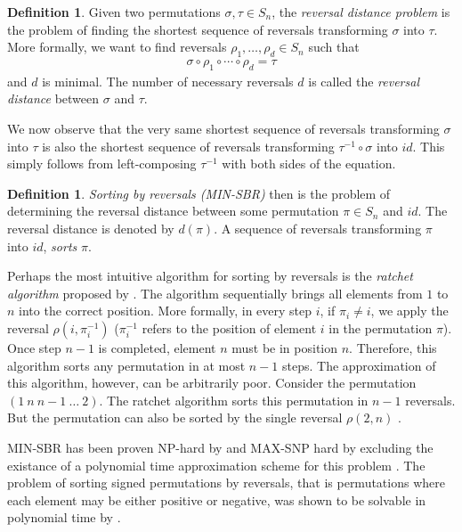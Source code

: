 \documentclass[11pt,DIV=11]{scrartcl}
\theoremstyle{definition}
\newtheorem{definition}[theorem]{Definition}
\theoremstyle{remark}
\begin{document}
\begin{definition}
Given two permutations $\sigma, \tau \in S_n$, the \textit{reversal distance problem} is the problem of finding the shortest sequence of reversals transforming $\sigma$ into $\tau$. More formally, we want to find reversals $\rho_1, \dots, \rho_d \in S_n$ such that
\begin{align*}
    \sigma \circ \rho_1 \circ \cdots \circ \rho_d = \tau
\end{align*}
and $d$ is minimal.
The number of necessary reversals $d$ is called the \textit{reversal distance} between $\sigma$ and $\tau$.
\end{definition}

We now observe that the very same shortest sequence of reversals transforming $\sigma$ into $\tau$ is also the shortest sequence of reversals transforming $\tau^{-1} \circ \sigma$ into $id$. This simply follows from left-composing $\tau^{-1}$ with both sides of the equation.

\begin{definition}
\textit{Sorting by reversals (MIN-SBR)} then is the problem of determining the reversal distance between some permutation $\pi \in S_n$ and $id$. The reversal distance is denoted by $d(\pi)$. A sequence of reversals transforming $\pi$ into $id$, \textit{sorts} $\pi$.
\end{definition}

Perhaps the most intuitive algorithm for sorting by reversals is the \textit{ratchet algorithm} proposed by \citeauthor*{Watterson19821} \cite{Watterson19821}. The algorithm sequentially brings all elements from $1$ to $n$ into the correct position. More formally, in every step $i$, if $\pi_i \neq i$, we apply the reversal $\rho(i, \pi_i^{-1})$ ($\pi_i^{-1}$ refers to the position of element $i$ in the permutation $\pi$). Once step $n-1$ is completed, element $n$ must be in position $n$. Therefore, this algorithm sorts any permutation in at most $n-1$ steps. The approximation of this algorithm, however, can be arbitrarily poor. Consider the permutation $(1\ n\ n-1\ \dots\ 2)$. The ratchet algorithm sorts this permutation in $n-1$ reversals. But the permutation can also be sorted by the single reversal $\rho(2, n)$ \cite{Kececioglu1995}.

MIN-SBR has been proven NP-hard by \citeauthor*{Caprara1997} \cite{Caprara1997} and MAX-SNP hard by \citeauthor*{Berman1999} excluding the existance of a polynomial time approximation scheme for this problem \cite{Berman1999}. The problem of sorting signed permutations by reversals, that is permutations where each element may be either positive or negative, was shown to be solvable in polynomial time by \citeauthor*{Hannenhalli1995} \cite{Hannenhalli1995}.
\end{document}
